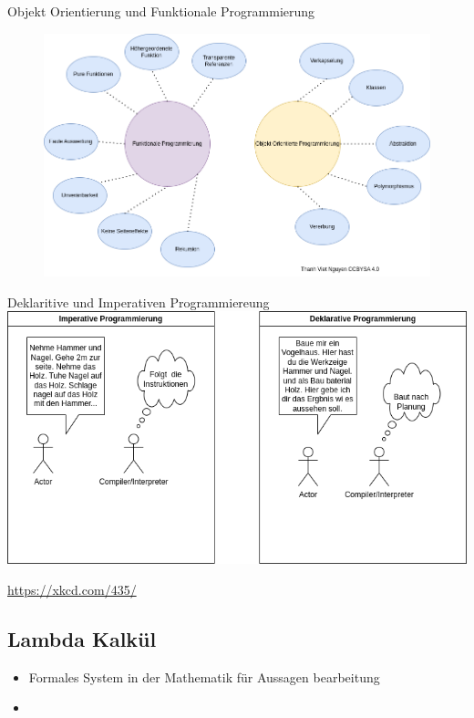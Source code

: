 \documentclass{beamer}
\begin{document}
\begin{frame}{Objekt Orientierung und Funktionale Programmierung}
\begin{figure}
    \centering
    \includegraphics[scale=0.38]{bilder/Unterschiede.drawio.png}
\end{figure}

\end{frame}

\begin{frame}{Deklaritive und Imperativen Programmiereung}
\centering
\includegraphics[scale=0.38]{bilder/ProgrammierParadigmen.drawio.png}

\end{frame}

\begin{frame}

    \url{https://xkcd.com/435/}
\end{frame}

\subsection{Lambda Kalkül}
\begin{frame}
	\begin{itemize}
	    \item Formales System in der Mathematik für Aussagen bearbeitung
            \item
	\end{itemize}
\end{frame}
\end{document}
